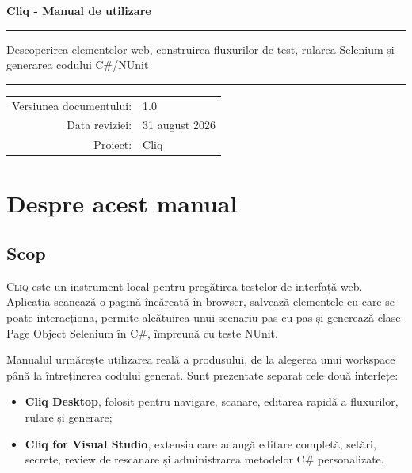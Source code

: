 \documentclass[12pt,a4paper]{report}
\newcommand{\Cliq}{\textsc{Cliq}}
\begin{document}
\hypersetup{pageanchor=false}
\begin{titlepage}
  \centering\vspace*{2.2cm}
  {\Huge\bfseries\color{cliqblue}Cliq - Manual de utilizare\par}
  \vspace{0.8cm}{\Large Aplicația Desktop și extensia pentru Visual Studio\par}
  \vspace{1.8cm}\rule{0.72\textwidth}{0.6pt}\par\vspace{0.6cm}
  {\large Descoperirea elementelor web, construirea fluxurilor de test, rularea Selenium și generarea codului C\#/NUnit\par}
  \vspace{0.6cm}\rule{0.72\textwidth}{0.6pt}\par\vfill
  \begin{tabular}{rl}Versiunea documentului: & 1.0 \\
  Data reviziei: & 31 august 2026 \\ Proiect: & Cliq\end{tabular}
  \vspace*{1.5cm}
\end{titlepage}

\hypersetup{pageanchor=true}
\tableofcontents\clearpage{}

\chapter{Despre acest manual}

\section{Scop}

\Cliq{} este un instrument local pentru pregătirea testelor de interfață web. Aplicația scanează o pagină încărcată în browser, salvează elementele cu care se poate interacționa, permite alcătuirea unui scenariu pas cu pas și generează clase Page Object Selenium în C\#, împreună cu teste NUnit.

Manualul urmărește utilizarea reală a produsului, de la alegerea unui workspace până la întreținerea codului generat. Sunt prezentate separat cele două interfețe:

\begin{itemize}
  \item \textbf{Cliq Desktop}, folosit pentru navigare, scanare, editarea rapidă a fluxurilor, rulare și generare;
  \item \textbf{Cliq for Visual Studio}, extensia care adaugă editare completă, setări, secrete, review de rescanare și administrarea metodelor C\# personalizate.
\end{itemize}
\end{document}

